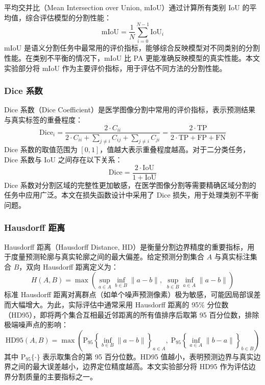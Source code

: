 平均交并比（Mean Intersection over Union, mIoU）通过计算所有类别 IoU 的平均值，综合评估模型的分割性能：
\begin{equation}
\text{mIoU} = \frac{1}{N} \sum_{i=0}^{N-1} \text{IoU}_i
\label{eq:mean_iou}
\end{equation}
mIoU 是语义分割任务中最常用的评价指标，能够综合反映模型对不同类别的分割性能。在类别不平衡的情况下，mIoU 比 PA 更能准确反映模型的真实性能。本文实验部分将 mIoU 作为主要评价指标，用于评估不同方法的分割性能。

\subsubsection{Dice 系数}

Dice 系数（Dice Coefficient）是医学图像分割中常用的评价指标，表示预测结果与真实标签的重叠程度：
\begin{equation}
\text{Dice}_i = \frac{2 \cdot C_{ii}}{2 \cdot C_{ii} + \sum_{j \neq i} C_{ij} + \sum_{j \neq i} C_{ji}} = \frac{2 \cdot \text{TP}}{2 \cdot \text{TP} + \text{FP} + \text{FN}}
\label{eq:dice}
\end{equation}
Dice 系数的取值范围为 $[0, 1]$，值越大表示重叠程度越高。对于二分类任务，Dice 系数与 IoU 之间存在以下关系：
\begin{equation}
\text{Dice} = \frac{2 \cdot \text{IoU}}{1 + \text{IoU}}
\label{eq:dice_iou_relation}
\end{equation}
Dice 系数对分割区域的完整性更加敏感，在医学图像分割等需要精确区域分割的任务中应用广泛。本文在损失函数设计中采用了 Dice 损失，用于处理类别不平衡问题。

\subsubsection{Hausdorff 距离}

Hausdorff 距离（Hausdorff Distance, HD）是衡量分割边界精度的重要指标，用于度量预测轮廓与真实轮廓之间的最大偏差。给定预测分割集合 $A$ 与真实标注集合 $B$，双向 Hausdorff 距离定义为：
\begin{equation}
H(A, B) = \max\!\left(\sup_{a \in A} \inf_{b \in B} \|a - b\|,\; \sup_{b \in B} \inf_{a \in A} \|a - b\|\right)
\label{eq:hausdorff}
\end{equation}
标准 Hausdorff 距离对离群点（如单个噪声预测像素）极为敏感，可能因局部误差而大幅增大。为此，实际评估中通常采用 Hausdorff 距离的 95\% 分位数（HD95），即将两个集合互相最近邻距离的所有值排序后取第 95 百分位数，排除极端噪声点的影响：
\begin{equation}
\text{HD95}(A, B) = \max\!\left(\text{P}_{95}\!\left\{\inf_{b \in B}\|a - b\|\right\}_{a \in A},\; \text{P}_{95}\!\left\{\inf_{a \in A}\|b - a\|\right\}_{b \in B}\right)
\label{eq:hd95}
\end{equation}
其中 $\text{P}_{95}\{\cdot\}$ 表示取集合的第 95 百分位数。HD95 值越小，表明预测边界与真实边界之间的最大误差越小，边界定位精度越高。本文实验部分将 HD95 作为评估边界分割质量的主要指标之一。

